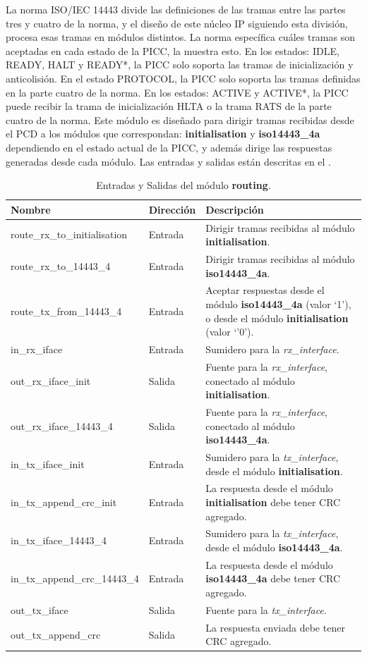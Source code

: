 \documentclass[a4paper, twoside, 11pt]{report}
\begin{document}
La norma ISO/IEC 14443 divide las definiciones de las tramas entre las partes tres y cuatro de la norma, y el diseño de este núcleo IP siguiendo esta división, procesa esas tramas en módulos distintos. La norma específica cuáles tramas son aceptadas en cada estado de la PICC, la  muestra esto. En los estados: IDLE, READY, HALT y READY*, la PICC solo soporta las tramas de inicialización y anticolisión. En el estado PROTOCOL, la PICC solo soporta las tramas definidas en la parte cuatro de la norma. En los estados: ACTIVE y ACTIVE*, la PICC puede recibir la trama de inicialización HLTA o la trama RATS de la parte cuatro de la norma. Este módulo es diseñado para dirigir tramas recibidas desde el PCD a los módulos que correspondan: \textbf{initialisation} y \textbf{iso14443\_4a} dependiendo en el estado actual de la PICC, y además dirige las respuestas generadas desde cada módulo. Las entradas y salidas están descritas en el .

\begin{table}[htb]
  \centering
  \tablezebra
  \begin{tabulary}{\linewidth}{l|l|L}
    \textbf{Nombre}&\textbf{Dirección}&\textbf{Descripción} \\
    \hline
    route\_rx\_to\_initialisation&Entrada&Dirigir tramas recibidas al módulo \textbf{initialisation}. \\
    route\_rx\_to\_14443\_4&Entrada&Dirigir tramas recibidas al módulo \textbf{iso14443\_4a}. \\
    route\_tx\_from\_14443\_4&Entrada&Aceptar respuestas desde el módulo \textbf{iso14443\_4a} (valor ‘1’), o desde el módulo \textbf{initialisation} (valor ‘’0’). \\
    in\_rx\_iface&Entrada&Sumidero para la \textit{rx\_interface}. \\
    out\_rx\_iface\_init&Salida&Fuente para la \textit{rx\_interface}, conectado al módulo \textbf{initialisation}. \\
    out\_rx\_iface\_14443\_4&Salida&Fuente para la \textit{rx\_interface}, conectado al módulo \textbf{iso14443\_4a}. \\
    in\_tx\_iface\_init&Entrada&Sumidero para la \textit{tx\_interface}, desde el módulo \textbf{initialisation}. \\
    in\_tx\_append\_crc\_init&Entrada&La respuesta desde el módulo \textbf{initialisation} debe tener CRC agregado. \\
    in\_tx\_iface\_14443\_4&Entrada&Sumidero para la \textit{tx\_interface}, desde el módulo \textbf{iso14443\_4a}. \\
    in\_tx\_append\_crc\_14443\_4&Entrada&La respuesta desde el módulo \textbf{iso14443\_4a} debe tener CRC agregado. \\
    out\_tx\_iface&Salida&Fuente para la \textit{tx\_interface}. \\
    out\_tx\_append\_crc&Salida&La respuesta enviada debe tener CRC agregado. \\
  \end{tabulary}
  \caption{Entradas y Salidas del módulo \textbf{routing}.}
  \label{tab:ports_routing}
\end{table}
\end{document}
